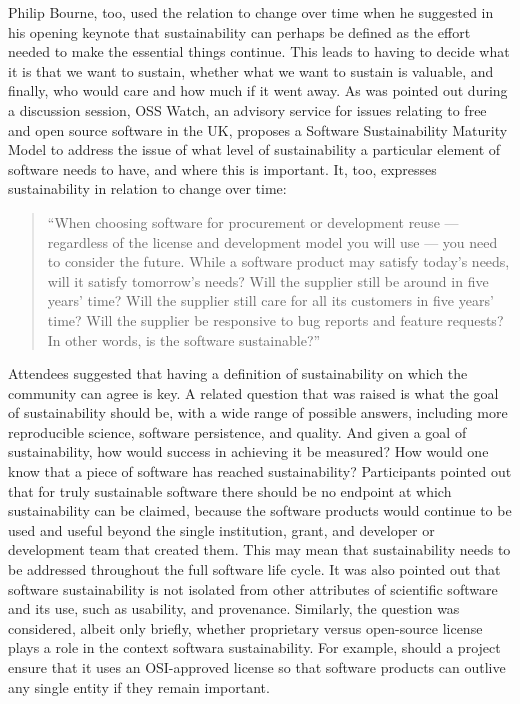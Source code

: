 \documentclass[11pt, oneside]{amsart}
\begin{document}
Philip Bourne, too, used the relation to change over time when he
suggested in his opening keynote that sustainability can perhaps be
defined as the effort needed to make the essential things continue.
This leads to having to decide what it is that we want to sustain,
whether what we want to sustain is valuable, and finally, who would
care and how much if it went away. As was pointed out during a
discussion session, OSS Watch, an advisory service for issues relating
to free and open source software in the UK, proposes a Software
Sustainability Maturity Model to address the issue of what level of
sustainability a particular element of software needs to have, and
where this is important. It, too, expresses sustainability in relation
to change over time:
\begin{quote}``When choosing software for procurement or
development reuse --- regardless of the license and development model you will
use --- you need to consider the future. While a software product may satisfy
today's needs, will it satisfy tomorrow's needs? Will the supplier still be
around in five years' time? Will the supplier still care for all its customers
in five years' time? Will the supplier be responsive to bug reports and feature
requests? In other words, is the software sustainable?''~\cite{OSS-ssmm-web}
\end{quote}

Attendees suggested that having a definition of sustainability on
which the community can agree is key.  A related question that was
raised is what the goal of sustainability should be, with a wide range
of possible answers, including more reproducible science, software
persistence, and quality.  And given a goal of sustainability, how
would success in achieving it be measured?  How would one know that a
piece of software has reached sustainability? Participants pointed out
that for truly sustainable software there should be no endpoint at
which sustainability can be claimed, because the software products
would continue to be used and useful beyond the single institution,
grant, and developer or development team that created them. This may
mean that sustainability needs to be addressed throughout the full
software life cycle.  It was also pointed out that software
sustainability is not isolated from other attributes of scientific
software and its use, such as usability, and provenance. Similarly,
the question was considered, albeit only briefly, whether proprietary
versus open-source license plays a role in the context softwara
sustainability. For example, should a project ensure that it uses an
OSI-approved license so that software products can outlive any single
entity if they remain important.
\end{document}
